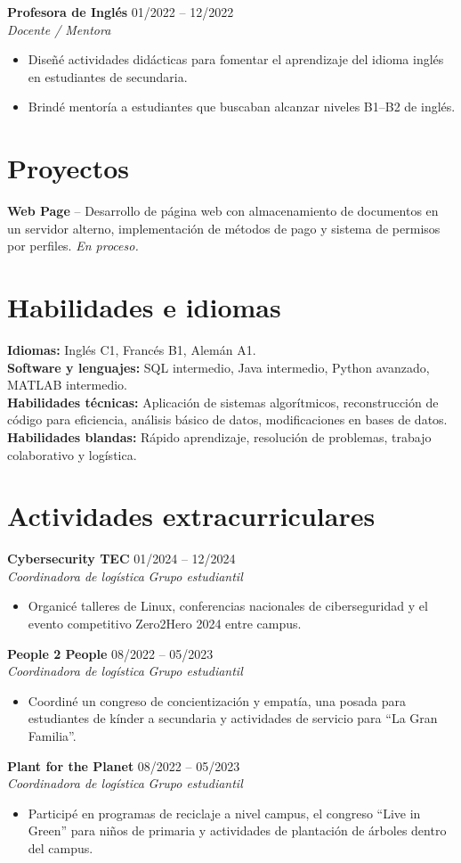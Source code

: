 \documentclass[10pt,letterpaper]{article}
\newcommand{\resumeSubheading}[4]{
  \textbf{#1} \hfill #2 \\
  \textit{#3} \hfill \textit{#4} \\
}
\newcommand{\resumeItem}[1]{\item #1}
\begin{document}
\resumeSubheading
{Profesora de Inglés}{01/2022 -- 12/2022}
{Docente / Mentora}{ }
\begin{itemize}
    \resumeItem{Diseñé actividades didácticas para fomentar el aprendizaje del idioma inglés en estudiantes de secundaria.}
    \resumeItem{Brindé mentoría a estudiantes que buscaban alcanzar niveles B1--B2 de inglés.}
\end{itemize}

\section{Proyectos}
\textbf{Web Page} -- Desarrollo de página web con almacenamiento de documentos en un servidor alterno, implementación de métodos de pago y sistema de permisos por perfiles. \textit{En proceso.}

\section{Habilidades e idiomas}
\textbf{Idiomas:} Inglés C1, Francés B1, Alemán A1. \\
\textbf{Software y lenguajes:} SQL intermedio, Java intermedio, Python avanzado, MATLAB intermedio. \\
\textbf{Habilidades técnicas:} Aplicación de sistemas algorítmicos, reconstrucción de código para eficiencia, análisis básico de datos, modificaciones en bases de datos. \\
\textbf{Habilidades blandas:} Rápido aprendizaje, resolución de problemas, trabajo colaborativo y logística.

\section{Actividades extracurriculares}
\resumeSubheading
{Cybersecurity TEC}{01/2024 -- 12/2024}
{Coordinadora de logística}{Grupo estudiantil}
\begin{itemize}
    \resumeItem{Organicé talleres de Linux, conferencias nacionales de ciberseguridad y el evento competitivo Zero2Hero 2024 entre campus.}
\end{itemize}

\resumeSubheading
{People 2 People}{08/2022 -- 05/2023}
{Coordinadora de logística}{Grupo estudiantil}
\begin{itemize}
    \resumeItem{Coordiné un congreso de concientización y empatía, una posada para estudiantes de kínder a secundaria y actividades de servicio para ``La Gran Familia''.}
\end{itemize}

\resumeSubheading
{Plant for the Planet}{08/2022 -- 05/2023}
{Coordinadora de logística}{Grupo estudiantil}
\begin{itemize}
    \resumeItem{Participé en programas de reciclaje a nivel campus, el congreso ``Live in Green'' para niños de primaria y actividades de plantación de árboles dentro del campus.}
\end{itemize}
\end{document}
